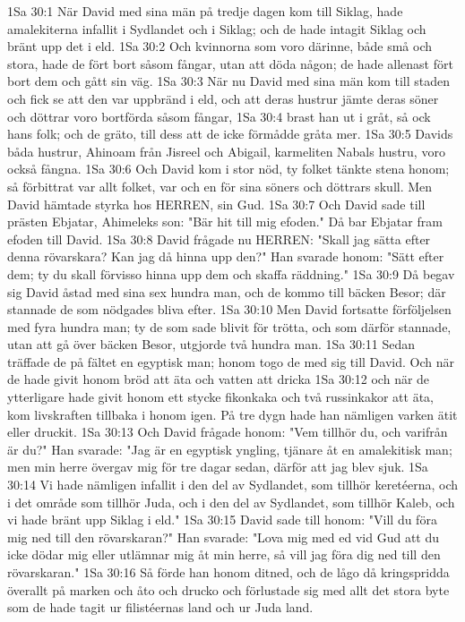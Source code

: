 1Sa 30:1  När David med sina män på tredje dagen kom till Siklag, hade amalekiterna infallit i Sydlandet och i Siklag; och de hade intagit Siklag och bränt upp det i eld.
1Sa 30:2  Och kvinnorna som voro därinne, både små och stora, hade de fört bort såsom fångar, utan att döda någon; de hade allenast fört bort dem och gått sin väg.
1Sa 30:3  När nu David med sina män kom till staden och fick se att den var uppbränd i eld, och att deras hustrur jämte deras söner och döttrar voro bortförda såsom fångar,
1Sa 30:4  brast han ut i gråt, så ock hans folk; och de gräto, till dess att de icke förmådde gråta mer.
1Sa 30:5  Davids båda hustrur, Ahinoam från Jisreel och Abigail, karmeliten Nabals hustru, voro också fångna.
1Sa 30:6  Och David kom i stor nöd, ty folket tänkte stena honom; så förbittrat var allt folket, var och en för sina söners och döttrars skull. Men David hämtade styrka hos HERREN, sin Gud.
1Sa 30:7  Och David sade till prästen Ebjatar, Ahimeleks son: "Bär hit till mig efoden." Då bar Ebjatar fram efoden till David.
1Sa 30:8  David frågade nu HERREN: "Skall jag sätta efter denna rövarskara? Kan jag då hinna upp den?" Han svarade honom: "Sätt efter dem; ty du skall förvisso hinna upp dem och skaffa räddning."
1Sa 30:9  Då begav sig David åstad med sina sex hundra man, och de kommo till bäcken Besor; där stannade de som nödgades bliva efter.
1Sa 30:10  Men David fortsatte förföljelsen med fyra hundra man; ty de som sade blivit för trötta, och som därför stannade, utan att gå över bäcken Besor, utgjorde två hundra man.
1Sa 30:11  Sedan träffade de på fältet en egyptisk man; honom togo de med sig till David. Och när de hade givit honom bröd att äta och vatten att dricka
1Sa 30:12  och när de ytterligare hade givit honom ett stycke fikonkaka och två russinkakor att äta, kom livskraften tillbaka i honom igen. På tre dygn hade han nämligen varken ätit eller druckit.
1Sa 30:13  Och David frågade honom: "Vem tillhör du, och varifrån är du?" Han svarade: "Jag är en egyptisk yngling, tjänare åt en amalekitisk man; men min herre övergav mig för tre dagar sedan, därför att jag blev sjuk.
1Sa 30:14  Vi hade nämligen infallit i den del av Sydlandet, som tillhör keretéerna, och i det område som tillhör Juda, och i den del av Sydlandet, som tillhör Kaleb, och vi hade bränt upp Siklag i eld."
1Sa 30:15  David sade till honom: "Vill du föra mig ned till den rövarskaran?" Han svarade: "Lova mig med ed vid Gud att du icke dödar mig eller utlämnar mig åt min herre, så vill jag föra dig ned till den rövarskaran."
1Sa 30:16  Så förde han honom ditned, och de lågo då kringspridda överallt på marken och åto och drucko och förlustade sig med allt det stora byte som de hade tagit ur filistéernas land och ur Juda land.
